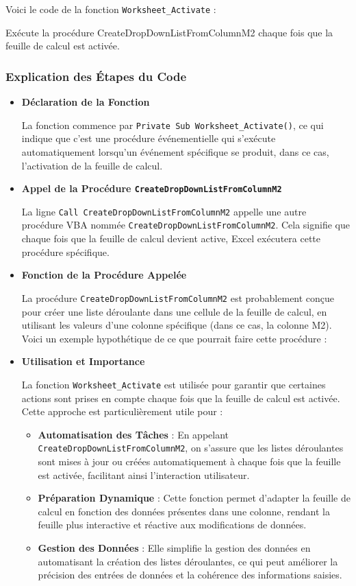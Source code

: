 \documentclass[a4paper, oneside, 12pt, final]{extreport}
\begin{document}
Voici le code de la fonction \texttt{Worksheet\_Activate} :

Exécute la procédure CreateDropDownListFromColumnM2 chaque fois que la feuille de calcul est activée.
\subsubsection{Explication des Étapes du Code}

\begin{itemize}

\item \textbf{Déclaration de la Fonction}

La fonction commence par \texttt{Private Sub Worksheet\_Activate()}, ce qui indique que c'est une procédure événementielle qui s'exécute automatiquement lorsqu'un événement spécifique se produit, dans ce cas, l'activation de la feuille de calcul.

\item \textbf{Appel de la Procédure \texttt{CreateDropDownListFromColumnM2}}

La ligne \texttt{Call CreateDropDownListFromColumnM2} appelle une autre procédure VBA nommée \texttt{CreateDropDownListFromColumnM2}. Cela signifie que chaque fois que la feuille de calcul devient active, Excel exécutera cette procédure spécifique.

\item \textbf{Fonction de la Procédure Appelée}

La procédure \texttt{CreateDropDownListFromColumnM2} est probablement conçue pour créer une liste déroulante dans une cellule de la feuille de calcul, en utilisant les valeurs d'une colonne spécifique (dans ce cas, la colonne M2). Voici un exemple hypothétique de ce que pourrait faire cette procédure :




\item \textbf{Utilisation et Importance}

La fonction \texttt{Worksheet\_Activate} est utilisée pour garantir que certaines actions sont prises en compte chaque fois que la feuille de calcul est activée. Cette approche est particulièrement utile pour :

\begin{itemize}
    \item \textbf{Automatisation des Tâches} : En appelant \texttt{CreateDropDownListFromColumnM2}, on s'assure que les listes déroulantes sont mises à jour ou créées automatiquement à chaque fois que la feuille est activée, facilitant ainsi l'interaction utilisateur.
    \item \textbf{Préparation Dynamique} : Cette fonction permet d'adapter la feuille de calcul en fonction des données présentes dans une colonne, rendant la feuille plus interactive et réactive aux modifications de données.
    \item \textbf{Gestion des Données} : Elle simplifie la gestion des données en automatisant la création des listes déroulantes, ce qui peut améliorer la précision des entrées de données et la cohérence des informations saisies.
\end{itemize}

\end{itemize}
\end{document}
